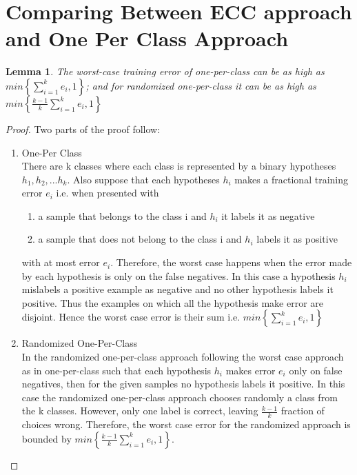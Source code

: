 \documentclass[11pt]{article}
\newtheorem{lemma}[theorem]{Lemma}
\begin{document}
\section{Comparing Between ECC approach and One Per Class Approach}
   \begin{lemma} 
        The worst-case training error of one-per-class can be as high as $min\left\{\sum_{i=1}^k e_i , 1\right\}$; and for randomized one-per-class it can be as high as $min\left\{\frac{k-1}{k}\sum_{i=1}^k e_i,1\right\}$
   \end{lemma}
   \begin{proof} 
        Two parts of the proof follow:
         \begin{enumerate}
                \item One-Per Class\\
                    There are k classes where each class is represented by a binary hypotheses $h_1,h_2,...h_k$. Also suppose that each hypotheses $h_i$ makes a fractional training error $e_i$ i.e. when presented with 
                    \begin{enumerate}
                        \item a sample that belongs to the class i and $h_i$ it labels it as negative
                         \item a sample that does not belong to the class i and $h_i$ labels it as positive
                    \end{enumerate}
                    with at most error $e_i$. Therefore, the worst case happens when the error made by each hypothesis is only on the false negatives. In this case a hypothesis $h_i$ mislabels a positive example as negative and no other hypothesis labels it positive. Thus the examples on which all the hypothesis make error are disjoint. Hence the worst case error is their sum i.e. $min\left\{\sum_{i=1}^k e_i , 1\right\}$ 
        
                \item Randomized One-Per-Class\\
                    In the randomized one-per-class approach following the worst case approach as in one-per-class such that each hypothesis $h_i$ makes error $e_i$ only on false negatives, then for the given samples no hypothesis labels it positive. In this case the randomized one-per-class approach chooses randomly a class from the k classes. However, only one label is correct, leaving $\frac{k-1}{k}$ fraction of choices wrong. Therefore, the worst case error for the randomized approach is bounded by $min\left\{\frac{k-1}{k}\sum_{i=1}^k e_i,1\right\}$.
         \end{enumerate} 
    \end{proof}
    
\end{document}
